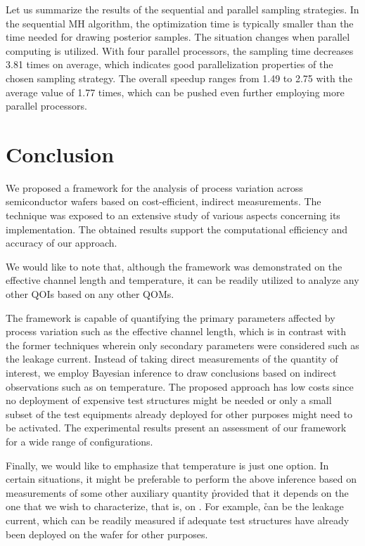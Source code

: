 
Let us summarize the results of the sequential and parallel sampling strategies.
In the sequential MH algorithm, the optimization time is typically smaller than
the time needed for drawing posterior samples. The situation changes when
parallel computing is utilized. With four parallel processors, the sampling time
decreases 3.81 times on average, which indicates good parallelization properties
of the chosen sampling strategy. The overall speedup ranges from 1.49 to 2.75
with the average value of 1.77 times, which can be pushed even further employing
more parallel processors.

\section{Conclusion}

We proposed a framework for the analysis of process variation across
semiconductor wafers based on cost-efficient, indirect measurements. The
technique was exposed to an extensive study of various aspects concerning its
implementation. The obtained results support the computational efficiency and
accuracy of our approach.

We would like to note that, although the framework was demonstrated on the
effective channel length and temperature, it can be readily utilized to analyze
any other \acp{QOI} based on any other \acp{QOM}.

The framework is capable of quantifying the primary parameters affected by
process variation such as the effective channel length, which is in contrast
with the former techniques wherein only secondary parameters were considered
such as the leakage current. Instead of taking direct measurements of the
quantity of interest, we employ Bayesian inference to draw conclusions based on
indirect observations such as on temperature. The proposed approach has low
costs since no deployment of expensive test structures might be needed or only a
small subset of the test equipments already deployed for other purposes might
need to be activated. The experimental results present an assessment of our
framework for a wide range of configurations.

Finally, we would like to emphasize that temperature is just one option. In
certain situations, it might be preferable to perform the above inference based
on measurements of some other auxiliary quantity \h provided that it depends on
the one that we wish to characterize, that is, on \g. For example, \h can be the
leakage current, which can be readily measured if adequate test structures have
already been deployed on the wafer for other purposes.
